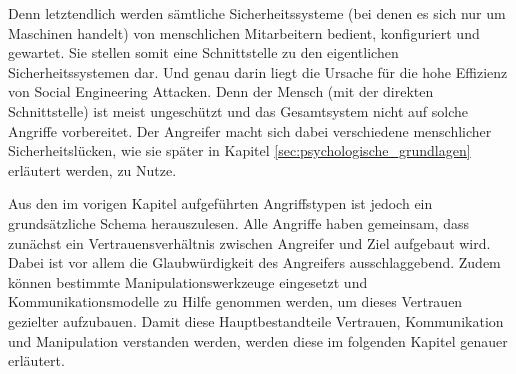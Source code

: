 Denn letztendlich werden sämtliche Sicherheitssysteme (bei denen es sich nur um Maschinen handelt) von menschlichen Mitarbeitern bedient, konfiguriert und gewartet.
Sie stellen somit eine Schnittstelle zu den eigentlichen Sicherheitssystemen dar.
Und genau darin liegt die Ursache für die hohe Effizienz von Social Engineering Attacken.
Denn der Mensch (mit der direkten Schnittstelle) ist meist ungeschützt und das Gesamtsystem nicht auf solche Angriffe vorbereitet.
Der Angreifer macht sich dabei verschiedene menschlicher Sicherheitslücken, wie sie später in Kapitel \vref{sec:psychologische_grundlagen} erläutert werden, zu Nutze.

Aus den im vorigen Kapitel aufgeführten Angriffstypen ist jedoch ein grundsätzliche Schema herauszulesen.
Alle Angriffe haben gemeinsam, dass zunächst ein Vertrauensverhältnis zwischen Angreifer und Ziel aufgebaut wird.
Dabei ist vor allem die Glaubwürdigkeit des Angreifers ausschlaggebend.
Zudem können bestimmte Manipulationswerkzeuge eingesetzt und Kommunikationsmodelle zu Hilfe genommen werden, um dieses Vertrauen gezielter aufzubauen.
Damit diese Hauptbestandteile Vertrauen, Kommunikation und Manipulation verstanden werden, werden diese im folgenden Kapitel genauer erläutert.


